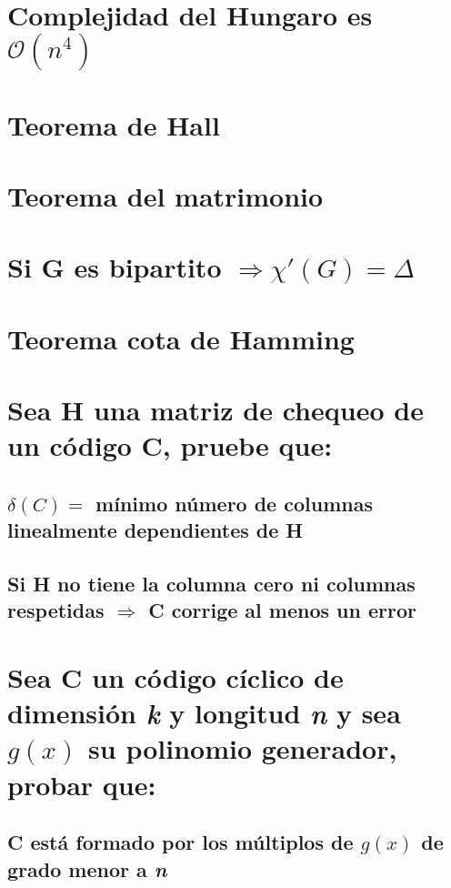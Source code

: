 \documentclass[12pt,a4paper]{report}
\begin{document}
	
	\section{Complejidad del Hungaro es $\mathcal{O}(n^{4})$}
	
	
	\section{Teorema de Hall}
	
	
	\section{Teorema del matrimonio}
	
	
	\section{Si G es bipartito $\Rightarrow \chi '(G) = \Delta $}

	
	\section{Teorema cota de Hamming}
	
	
	\section{Sea H una matriz de chequeo de un código C, pruebe que:}
	
		\subsection{$\delta (C) =$ mínimo número de columnas linealmente dependientes de H}
		
		\subsection{Si H no tiene la columna cero ni columnas respetidas $\Rightarrow$ C corrige al menos un error}


	\section{Sea C un código cíclico de dimensión \textit{k} y longitud \textit{n} y sea $g(x)$ su polinomio generador, probar que:}
	
		\subsection{C está formado por los múltiplos de $g(x)$ de grado menor a \textit{n}}
		
\end{document}
